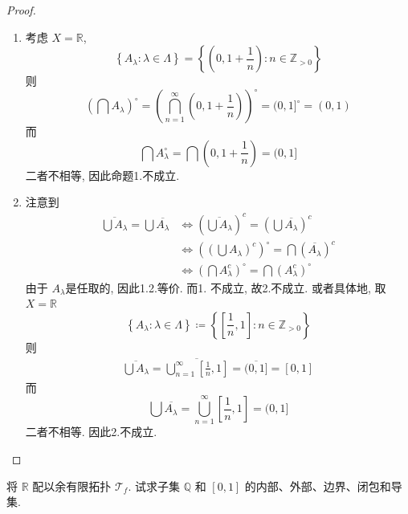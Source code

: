 \documentclass[../main.tex]{subfiles}
\begin{document}
\begin{proof}
    \begin{enumerate}
        \item 考虑 \(  X= \mathbb{R}   \),    \[
        \left\{ A_{ \lambda }: \lambda \in  \Lambda  \right\}= \left\{ \left(0, 1+ \frac{1 }{n }  \right): n \in \mathbb{Z} _{> 0}  \right\}
        \] 则 \[
        \left( \bigcap A_{ \lambda } \right)^{\circ}=  \left( \bigcap_{n = 1}^{\infty} \left( 0,1+ \frac{1 }{ n}  \right)  \right) ^{\circ}= (0,1]^{\circ}= \left( 0,1 \right) 
        \]而 \[
        \bigcap A_{ \lambda }^{\circ}= \bigcap \left( 0,1+ \frac{1 }{n }  \right)= (0,1] 
        \]二者不相等, 因此命题1.不成立.
        \item 注意到 \[
        \begin{aligned}
      \overline{\bigcup A_{ \lambda }}= \bigcup  \overline{A_{ \lambda }}&\iff \left( \overline{\bigcup A_{ \lambda }} \right)^{c}= \left( \bigcup  \overline{A_{ \lambda }} \right)^{c}  \\ 
       &\iff \left( \left( \bigcup A_{ \lambda } \right)^{c}  \right)^{\circ} =  \bigcap \left( \overline{A_{ \lambda }} \right)^{c} \\ 
        &\iff \left( \bigcap A_{ \lambda }^{c} \right)^{\circ}=   \bigcap \left( A_{ \lambda }^{c} \right)^{\circ} 
        \end{aligned}
        \]由于 \(  A_{ \lambda }  \)是任取的, 因此1.2.等价. 而1. 不成立, 故2.不成立. 或者具体地, 取 \(  X= \mathbb{R}   \) \[
        \left\{ A_{ \lambda }: \lambda \in  \Lambda  \right\}\coloneqq \left\{ [ \frac{1 }{n },1  ]: n \in \mathbb{Z} _{> 0}\right\}
        \]  则 \[
        \begin{aligned}
        \overline{\bigcup A_{ \lambda }}= \overline{\bigcup _{n = 1}^{\infty}[ \frac{1 }{n },1  ] }=  \overline{(0,1]}= [0,1]
        \end{aligned}
        \] 而 \[
        \bigcup  \overline{A_{ \lambda }}=  \bigcup _{n = 1}^{\infty}\left[ \frac{1 }{n },1  \right]= (0,1] 
        \]二者不相等. 因此2.不成立.
    \end{enumerate}
    

\end{proof}
\begin{exercise}{}{}
将 $\mathbb{R}$ 配以余有限拓扑 $\mathcal{T}_f$. 试求子集 $\mathbb{Q}$ 和 $[0,1]$ 的内部、外部、边界、闭包和导集.
\end{exercise}
\end{document}
